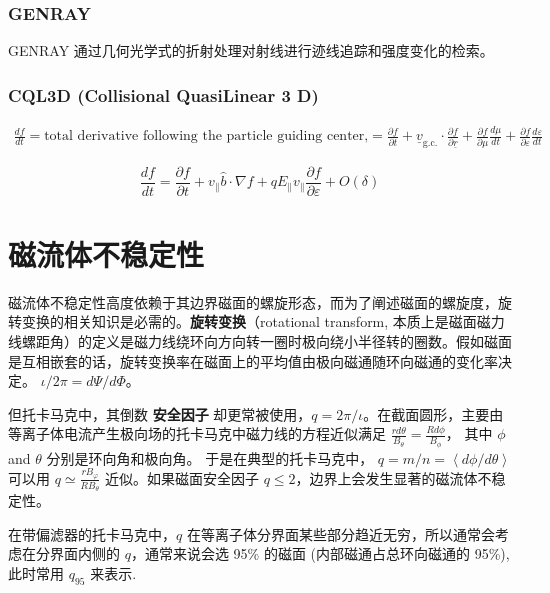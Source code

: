 \subsubsection{GENRAY}
GENRAY 通过几何光学式的折射处理对射线进行迹线追踪和强度变化的检索。


\subsubsection{CQL3D (Collisional QuasiLinear 3 D)}

\begin{multline}
\frac{d f}{d t}=\text{total derivative following the particle guiding center,}
=\frac{\partial f}{\partial t}+\underline{v}_{\mathrm{g.c.}} \cdot \frac{\partial f}{\partial \underline{r}}+\frac{\partial f}{\partial \mu} \frac{d \mu}{d t}+\frac{\partial f}{\partial \varepsilon} \frac{d \varepsilon}{d t}
\end{multline}


\begin{equation}\frac{d f}{d t}=\frac{\partial f}{\partial t}+v_{\|} \hat{b} \cdot \nabla f+q E_{\|} v_{\|} \frac{\partial f}{\partial \varepsilon}+O(\delta)\end{equation}

\section{磁流体不稳定性}
磁流体不稳定性高度依赖于其边界磁面的螺旋形态，而为了阐述磁面的螺旋度，旋转变换的相关知识是必需的。\textbf{旋转变换}（rotational transform, 本质上是磁面磁力线螺距角）的定义是磁力线绕环向方向转一圈时极向绕小半径转的圈数。假如磁面是互相嵌套的话，旋转变换率在磁面上的平均值由极向磁通随环向磁通的变化率决定。
$ \iota/2 \pi = d\Psi /d \Phi $。

但托卡马克中，其倒数 \textbf{安全因子} 却更常被使用，$q = 2\pi/\iota$。在截面圆形，主要由等离子体电流产生极向场的托卡马克中磁力线的方程近似满足 $ \frac{r d\theta}{B_\theta} = \frac{Rd\phi}{B_\phi} $，
其中 $ \phi $ and $\theta$ 分别是环向角和极向角。 于是在典型的托卡马克中， $ q = m/n = \left \langle d\phi /d\theta \right \rangle $ 可以用 $ q \simeq \frac{r B_\varphi}{R B_\theta} $ 近似。如果磁面安全因子 $q\leq 2$，边界上会发生显著的磁流体不稳定性。

在带偏滤器的托卡马克中，$q$ 在等离子体分界面某些部分趋近无穷，所以通常会考虑在分界面内侧的 $q$，通常来说会选 95\% 的磁面 (内部磁通占总环向磁通的 95\%), 此时常用 $q_{95}$ 来表示.




